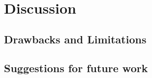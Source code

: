 \chapter{Discussion}
\label{ch:discussion}

\section{Drawbacks and Limitations}

\section{Suggestions for future work}
